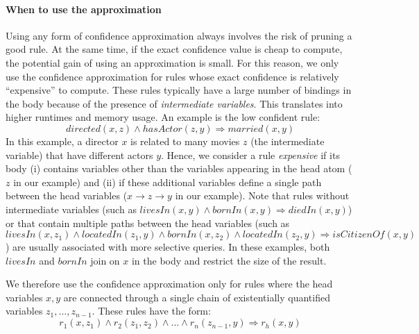 \paragraph{When to use the approximation}\label{sec:expensive_rules}
Using any form of confidence approximation  always involves the risk of pruning a good rule. 
At the same time, if the exact confidence value is cheap to compute, the potential gain of using an approximation is small.
For this reason, we only use the confidence approximation for rules whose exact confidence is relatively ``expensive'' to compute.
These rules typically have a large number of bindings in the body because of the presence of
\emph{intermediate variables}. This translates into 
higher runtimes and memory usage. An example is the low confident rule:
\[
 directed(x,z) \wedge hasActor(z,y) \Rightarrow married(x,y)
\]
In this example, a director $x$ is related to many movies $z$ (the intermediate variable) that have different actors $y$. 
Hence, we consider a rule \emph{expensive} if its body (i) contains variables other than the variables appearing in the head atom ($z$ in our example) and
(ii) if these additional variables define a single path between the head variables ($x \rightarrow z \rightarrow y$ in our example).
Note that rules without intermediate variables (such as $livesIn(x,y)\wedge bornIn(x,y)\Rightarrow diedIn(x,y)$)  
or that contain multiple paths between the head variables (such as $livesIn(x,z_1)\wedge locatedIn(z_1,y)\wedge bornIn(x,z_2)\wedge locatedIn(z_2,y) \Rightarrow isCitizenOf(x,y)$)
are usually associated with more selective queries. In these examples, both 
$livesIn$ and $bornIn$ join on $x$ in the body and restrict the size of the result.

We therefore use the confidence approximation only for rules where the head variables $x,y$ are connected through a single chain of existentially quantified variables $z_1,..., z_{n-1}$. These rules have the form:
$$
  r_1(x,z_1) \wedge r_2(z_1,z_2) \wedge ... \wedge r_n(z_{n-1},y) \Rightarrow r_h(x,y)
$$

